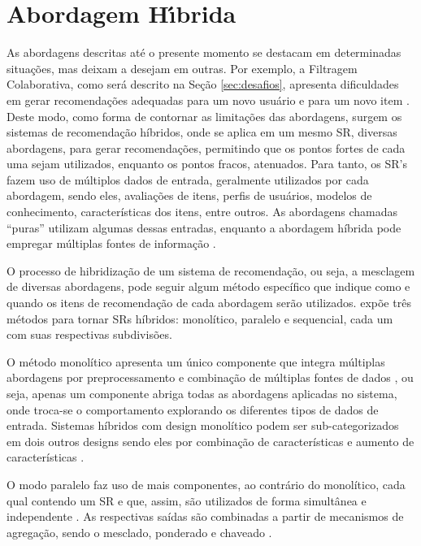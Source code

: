 \section{Abordagem H\'{\i}brida}

    As abordagens descritas até o presente momento se destacam em determinadas situações, mas deixam a desejam em outras. Por exemplo, a Filtragem Colaborativa, como será descrito na Seção \ref{sec:desafios}, apresenta dificuldades em gerar recomendações adequadas para um novo usuário e para um novo item \cite{Ricci2010}. Deste modo, como forma de contornar as limitações das abordagens, surgem os sistemas de recomendação híbridos, onde se aplica em um mesmo SR, diversas abordagens, para gerar recomendações, permitindo que os pontos fortes de cada uma sejam utilizados, enquanto os pontos fracos, atenuados. Para tanto, os SR's fazem uso de múltiplos dados de entrada, geralmente utilizados por cada abordagem, sendo eles, avaliações de itens, perfis de usuários, modelos de conhecimento, características dos itens, entre outros. As abordagens chamadas ``puras'' utilizam algumas dessas entradas, enquanto a abordagem híbrida pode empregar múltiplas fontes de informação \cite{Jannach2010}.
    
    O processo de hibridização de um sistema de recomendação, ou seja, a mesclagem de diversas abordagens, pode seguir algum método específico que indique como e quando os itens de recomendação de cada abordagem serão utilizados.  expõe três métodos para tornar SRs híbridos: monolítico, paralelo e sequencial, cada um com suas respectivas subdivisões.
    
    O método monolítico apresenta um único componente que integra múltiplas abordagens por preprocessamento e combinação de múltiplas fontes de dados \cite{Aggarwal2016}, ou seja, apenas um componente abriga todas as abordagens aplicadas no sistema, onde troca-se o comportamento explorando os diferentes tipos de dados de entrada. Sistemas híbridos com design monolítico podem ser sub-categorizados em dois outros designs sendo eles por combinação de características e aumento de características \cite{Jannach2010}.
    
    O modo paralelo faz uso de mais componentes, ao contrário do monolítico, cada qual contendo um SR e que, assim, são utilizados de forma simultânea e independente \cite{Aggarwal2016}. As respectivas saídas são combinadas a partir de mecanismos de agregação, sendo o mesclado, ponderado e chaveado \cite{Jannach2010}. 
    
